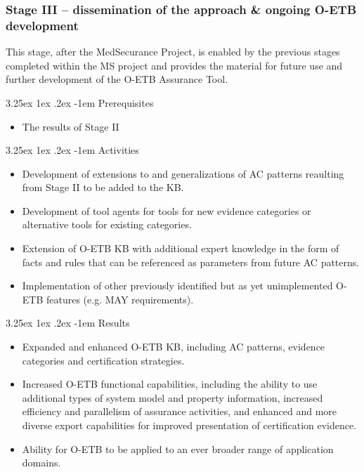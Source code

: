 \documentclass[12pt,twoside,a4paper]{article}
\makeatletter
\renewcommand\paragraph{\@startsection{paragraph}{5}{\z@}%
  {3.25ex \@plus1ex \@minus.2ex}%
  {-1em}%
  {\normalfont\normalsize\bfseries}}
\makeatother
\begin{document}
\hypertarget{stage-iii-dissemination-of-the-approach-ongoing-o-etb-development}{%
\subsubsection{Stage III -- dissemination of the approach \& ongoing O-ETB development}\label{stage-iii-dissemination-of-the-approach-ongoing-o-etb-development}}

This stage, after the MedSecurance Project, is enabled by the previous stages completed within the MS project and provides the material for future use and further development of the O-ETB Assurance Tool.

\hypertarget{prerequisites-3}{%
\paragraph{Prerequisites}\label{prerequisites-3}}

\begin{itemize}
\item
  The results of Stage II
\end{itemize}

\hypertarget{activities-2}{%
\paragraph{Activities}\label{activities-2}}

\begin{itemize}
\item
  Development of extensions to and generalizations of AC patterns reaulting from Stage II to be added to the KB.
\item
  Development of tool agents for tools for new evidence categories or alternative tools for existing categories.
\item
  Extension of O-ETB KB with additional expert knowledge in the form of facts and rules that can be referenced as parameters from future AC patterns.
\item
  Implementation of other previously identified but as yet unimplemented O-ETB features (e.g. MAY requirements).
\end{itemize}

\hypertarget{results-2}{%
\paragraph{Results}\label{results-2}}

\begin{itemize}
\item
  Expanded and enhanced O-ETB KB, including AC patterns, evidence categories and certification strategies.
\item
  Increased O-ETB functional capabilities, including the ability to use additional types of system model and property information, increased efficiency and parallelism of assurance activities, and enhanced and more diverse export capabilities for improved presentation of certification evidence.
\item
  Ability for O-ETB to be applied to an ever broader range of application domains.
\end{itemize}
\end{document}
